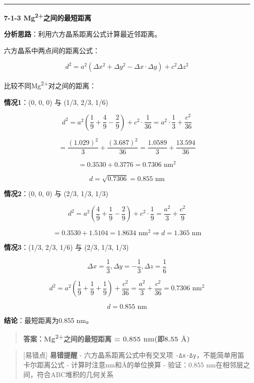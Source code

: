 \begin{center}\rule{0.5\linewidth}{0.5pt}\end{center}

\textbf{7-1-3 Mg\textsuperscript{2+}之间的最短距离}

\textbf{分析思路}：利用六方晶系距离公式计算最近邻距离。

六方晶系中两点间的距离公式：

\[d^2 = a^2(\Delta x^2 + \Delta y^2 - \Delta x \cdot \Delta y) + c^2 \Delta z^2\]

比较不同Mg\textsuperscript{2+}对之间的距离：

\textbf{情况1}：(0, 0, 0) 与 (1/3, 2/3, 1/6)

\[d^2 = a^2\left(\frac{1}{9} + \frac{4}{9} - \frac{2}{9}\right) + c^2 \cdot \frac{1}{36} = a^2 \cdot \frac{1}{3} + \frac{c^2}{36}\]

\[= \frac{(1.029)^2}{3} + \frac{(3.687)^2}{36} = \frac{1.0589}{3} + \frac{13.594}{36}\]

\[= 0.3530 + 0.3776 = 0.7306 \text{ nm}^2\]

\[d = \sqrt{0.7306} = 0.855 \text{ nm}\]

\textbf{情况2}：(0, 0, 0) 与 (2/3, 1/3, 1/3)

\[d^2 = a^2\left(\frac{4}{9} + \frac{1}{9} - \frac{2}{9}\right) + c^2 \cdot \frac{1}{9} = \frac{a^2}{3} + \frac{c^2}{9}\]

\[= 0.3530 + 1.5104 = 1.8634 \text{ nm}^2 \Rightarrow d = 1.365 \text{ nm}\]

\textbf{情况3}：(1/3, 2/3, 1/6) 与 (2/3, 1/3, 1/3)

\[\Delta x = \frac{1}{3}, \Delta y = -\frac{1}{3}, \Delta z = \frac{1}{6}\]

\[d^2 = a^2\left(\frac{1}{9} + \frac{1}{9} + \frac{1}{9}\right) + \frac{c^2}{36} = \frac{a^2}{3} + \frac{c^2}{36} = 0.7306 \text{ nm}^2\]

\[d = 0.855 \text{ nm}\]

\textbf{结论}：最短距离为0.855 nm。

\begin{quote}
\textbf{答案：Mg\textsuperscript{2+}之间的最短距离 = 0.855 nm(即8.55 Å)}
\end{quote}

\begin{quote}
{[}易错点{]} \textbf{易错提醒}
- 六方晶系距离公式中有交叉项 \texttt{-Δx·Δy}，不能简单用笛卡尔距离公式
- 计算时注意nm和Å的单位换算
- 验证：0.855 nm在相邻层之间，符合ABC堆积的几何关系
\end{quote}

